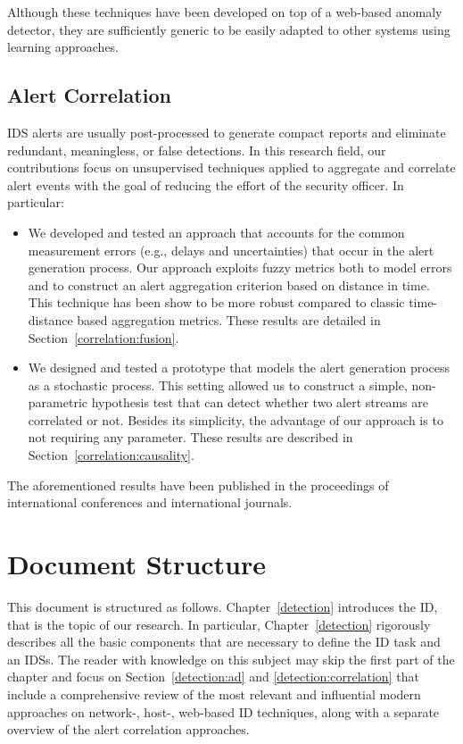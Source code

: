 Although these techniques have been developed on top of a web-based
anomaly detector, they are sufficiently generic to be easily adapted
to other systems using learning approaches.

\subsection{Alert Correlation} \ac{IDS} alerts are usually
post-processed to generate compact reports and eliminate redundant,
meaningless, or false detections. In this research field, our
contributions focus on unsupervised techniques applied to aggregate
and correlate alert events with the goal of reducing the effort of the
security officer. In particular:

\begin{itemize}
\item We developed and tested an approach that accounts for the common
measurement errors (e.g., delays and uncertainties) that occur in the
alert generation process. Our approach exploits fuzzy metrics both to
model errors and to construct an alert aggregation criterion based on
distance in time. This technique has been show to be more robust
compared to classic time-distance based aggregation metrics. These
results are detailed in Section~\ref{correlation:fusion}.
\item We designed and tested a prototype that models the alert
generation process as a stochastic process. This setting allowed us to
construct a simple, non-parametric hypothesis test that can detect
whether two alert streams are correlated or not. Besides its
simplicity, the advantage of our approach is to not requiring any
parameter. These results are described in
Section~\ref{correlation:causality}.
\end{itemize}

The aforementioned results have been published in the proceedings of
international conferences and international journals.

\section{Document Structure}
\label{introduction:structure} This document is structured as
follows. Chapter~\ref{detection} introduces the \ac{ID}, that is the
topic of our research. In particular, Chapter~\ref{detection}
rigorously describes all the basic components that are necessary to
define the \ac{ID} task and an \acp{IDS}. The reader with knowledge on
this subject may skip the first part of the chapter and focus on
Section~\ref{detection:ad} and \ref{detection:correlation} that
include a comprehensive review of the most relevant and influential
modern approaches on network-, host-, web-based \ac{ID} techniques,
along with a separate overview of the alert correlation approaches.


